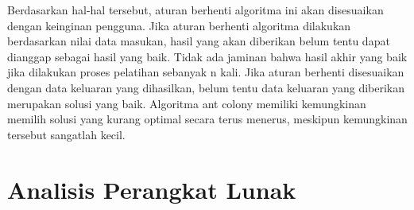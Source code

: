 	Berdasarkan hal-hal tersebut, aturan berhenti algoritma ini akan disesuaikan dengan keinginan
	pengguna. Jika aturan berhenti algoritma dilakukan berdasarkan nilai data masukan, hasil yang
	akan diberikan belum tentu dapat dianggap sebagai hasil yang baik. Tidak ada jaminan bahwa hasil
	akhir yang baik jika dilakukan proses pelatihan sebanyak n kali. Jika aturan berhenti disesuaikan
	dengan data keluaran yang dihasilkan, belum tentu data keluaran yang diberikan merupakan solusi
	yang baik. Algoritma ant colony memiliki kemungkinan memilih solusi yang kurang optimal secara
	terus menerus, meskipun kemungkinan tersebut sangatlah kecil.
	
	\section{Analisis Perangkat Lunak}
	
	
